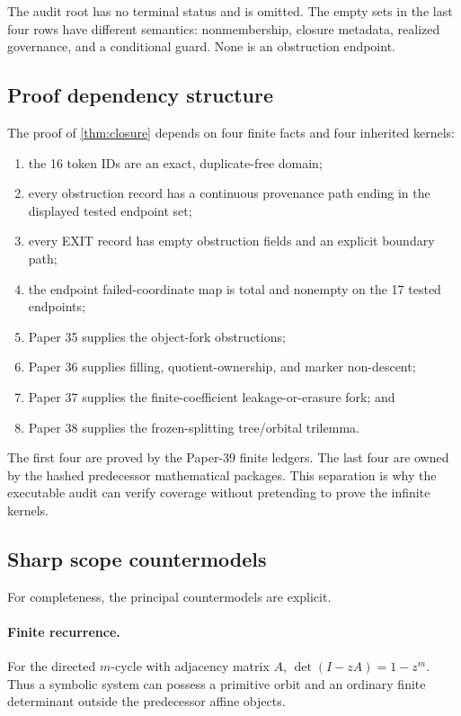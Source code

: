 The audit root  has no terminal status and is omitted.  The empty
sets in the last four rows have different semantics: nonmembership, closure
metadata, realized governance, and a conditional guard.  None is an
obstruction endpoint.

\subsection{Proof dependency structure}

The proof of \cref{thm:closure} depends on four finite facts and four inherited
kernels:
\begin{enumerate}
  \item the 16 token IDs are an exact, duplicate-free domain;
  \item every obstruction record has a continuous provenance path ending in
  the displayed tested endpoint set;
  \item every EXIT record has empty obstruction fields and an explicit boundary
  path;
  \item the endpoint failed-coordinate map is total and nonempty on the 17
  tested endpoints;
  \item Paper 35 supplies the object-fork obstructions;
  \item Paper 36 supplies filling, quotient-ownership, and marker non-descent;
  \item Paper 37 supplies the finite-coefficient leakage-or-erasure fork; and
  \item Paper 38 supplies the frozen-splitting tree/orbital trilemma.
\end{enumerate}
The first four are proved by the Paper-39 finite ledgers.  The last four are
owned by the hashed predecessor mathematical packages.  This separation is
why the executable audit can verify coverage without pretending to prove the
infinite kernels.

\subsection{Sharp scope countermodels}

For completeness, the principal countermodels are explicit.

\paragraph{Finite recurrence.}
For the directed $m$-cycle with adjacency matrix $A$,
$\det(I-zA)=1-z^m$.  Thus a symbolic system can possess a primitive orbit and
an ordinary finite determinant outside the predecessor affine objects.

